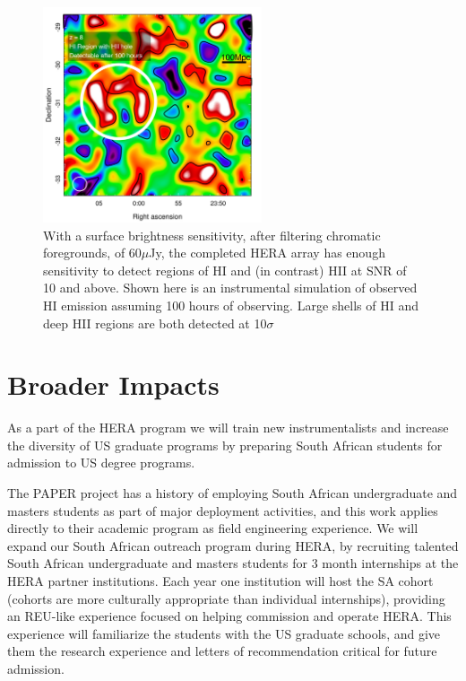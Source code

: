 \documentclass[preprint]{aastex}
\def\HI{{H{\small I }}}
\def\HII{{H{\small II }}}
\begin{document}
\begin{figure}[t] \centering
\includegraphics[height=2.5in]{plots/HERA_z8_SNR_annotated_v2.jpg}
\caption{\small 
With a surface brightness sensitivity, after filtering chromatic foregrounds,
of 60$\mu$Jy, the completed HERA array has enough sensitivity to detect regions of
\HI and (in contrast) \HII at SNR of 10 and above. Shown here is an instrumental
simulation of observed \HI emission assuming 100 hours of observing. Large
shells of \HI and deep \HII regions are both detected at 10$\sigma$  
\label{imaging}}
\end{figure}


\vspace{-0.25in}
\section{Broader Impacts}
\label{BIsec}
As a part of the HERA program we will train new instrumentalists and increase
the diversity of US graduate programs by preparing South African students for
admission to US degree programs.

The PAPER project has a history of employing South African undergraduate and
masters students as part of major deployment activities, and this work applies
directly to their academic program as field engineering experience.  We will
expand our South African outreach program during HERA, by recruiting talented
South African undergraduate and masters students for 3 month internships at the
HERA partner institutions. Each year one institution will host the SA cohort
(cohorts are more culturally appropriate than individual internships),
providing an REU-like experience focused on helping commission and operate
HERA. This experience will familiarize the students with the US graduate
schools, and give them the research experience and letters of recommendation
critical for future admission. 
\end{document}
